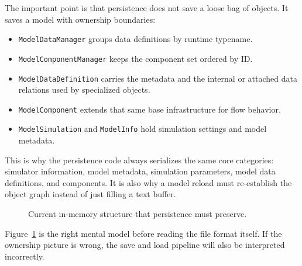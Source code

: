 The important point is that persistence does not save a loose bag of objects.
It saves a model with ownership boundaries:
\begin{itemize}
\item \texttt{ModelDataManager} groups data definitions by runtime typename.
\item \texttt{ModelComponentManager} keeps the component set ordered by ID.
\item \texttt{ModelDataDefinition} carries the metadata and the internal or
      attached data relations used by specialized objects.
\item \texttt{ModelComponent} extends that same base infrastructure for flow
      behavior.
\item \texttt{ModelSimulation} and \texttt{ModelInfo} hold simulation settings
      and model metadata.
\end{itemize}

This is why the persistence code always serializes the same core categories:
simulator information, model metadata, simulation parameters, model data
definitions, and components. It is also why a model reload must re-establish
the object graph instead of just filling a text buffer.

\begin{figure}[htbp]
\centering
\caption{Current in-memory structure that persistence must preserve.}
\label{fig:model-persistence-structure}
\end{figure}

Figure~\ref{fig:model-persistence-structure} is the right mental model before
reading the file format itself. If the ownership picture is wrong, the save and
load pipeline will also be interpreted incorrectly.

